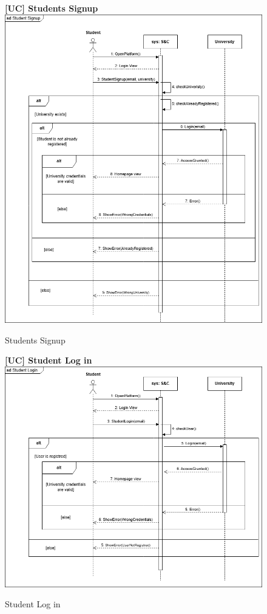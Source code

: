 \begin{figure}[H]
\textbf{[UC\nextUCDiagr] Students Signup}\newline\newline
\includegraphics[width=15cm]{Images/UC_diagram/RASD-UC1.drawio.png}
    \caption{Students Signup}
\end{figure}

\begin{figure}[H]
\textbf{[UC\nextUCDiagr] Student Log in}\newline\newline
\includegraphics[width=15cm]{Images/UC_diagram/RASD-UC2.drawio.png}
    \caption{Student Log in}
\end{figure}

